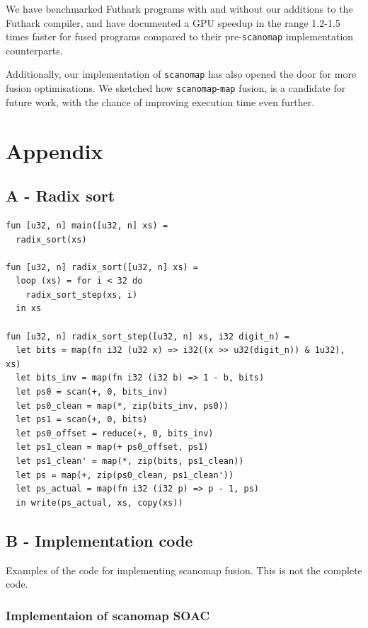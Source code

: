 \documentclass[11pt,bibliography=totocnumbered]{article}
\begin{document}
We have benchmarked Futhark programs with and without our additions to the Futhark compiler, and have documented a GPU speedup in the range 1.2-1.5 times faster for fused programs compared to their pre-\texttt{scanomap} implementation counterparts.

 Additionally, our implementation of \texttt{scanomap} has also opened the door for more fusion optimisations. We sketched how
 \texttt{scanomap}-\texttt{map} fusion, is a candidate for future work, with the chance of improving execution time even further.
\newpage




\newpage
\section{Appendix}
\subsection{A - Radix sort}
\begin{lstlisting}[caption=Test program] 
fun [u32, n] main([u32, n] xs) =
  radix_sort(xs)

fun [u32, n] radix_sort([u32, n] xs) =
  loop (xs) = for i < 32 do
    radix_sort_step(xs, i)
  in xs

fun [u32, n] radix_sort_step([u32, n] xs, i32 digit_n) =
  let bits = map(fn i32 (u32 x) => i32((x >> u32(digit_n)) & 1u32), xs)
  let bits_inv = map(fn i32 (i32 b) => 1 - b, bits)
  let ps0 = scan(+, 0, bits_inv)
  let ps0_clean = map(*, zip(bits_inv, ps0))
  let ps1 = scan(+, 0, bits)
  let ps0_offset = reduce(+, 0, bits_inv)
  let ps1_clean = map(+ ps0_offset, ps1)
  let ps1_clean' = map(*, zip(bits, ps1_clean))
  let ps = map(+, zip(ps0_clean, ps1_clean'))
  let ps_actual = map(fn i32 (i32 p) => p - 1, ps)
  in write(ps_actual, xs, copy(xs))

\end{lstlisting}

\newpage
\subsection{B - Implementation code}
Examples of the code for implementing scanomap fusion. This is not the complete code.

\subsubsection{Implementaion of scanomap SOAC}
\end{document}
